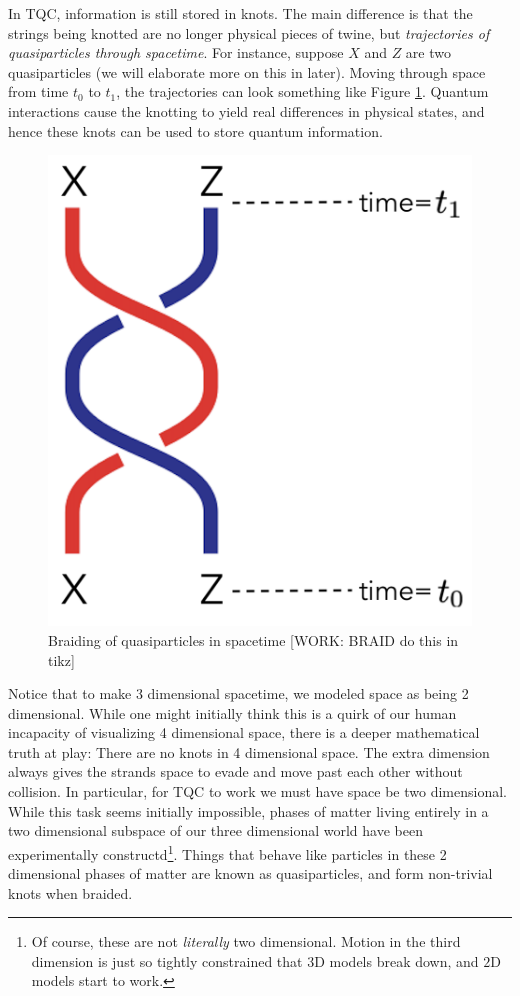 \documentclass{article}
\theoremstyle{definition}
\numberwithin{figure}{section}
\begin{document}
In TQC, information is still stored in knots. The main difference is that the strings being knotted are no longer physical pieces of twine, but \textit{trajectories of quasiparticles through spacetime}. For instance, suppose $X$ and $Z$ are two quasiparticles (we will elaborate more on this in later). Moving through space from time $t_0$ to $t_1$, the trajectories can look something like Figure \ref{fig:braiding}. Quantum interactions cause the knotting to yield real differences in physical states, and hence these knots can be used to store quantum information.

\begin{figure}
\begin{center}
\includegraphics[scale=0.25]{braiding}
\caption{Braiding of quasiparticles in spacetime [WORK: BRAID do this in tikz]}
\label{fig:braiding}
\end{center}
\end{figure}

Notice that to make 3 dimensional spacetime, we modeled space as being 2 dimensional. While one might initially think this is a quirk of our human incapacity of visualizing 4 dimensional space, there is a deeper mathematical truth at play: There are no knots in 4 dimensional space. The extra dimension always gives the strands space to evade and move past each other without collision. In particular, for TQC to work we must have space be two dimensional. While this task seems initially impossible, phases of matter living entirely in a two dimensional subspace of our three dimensional world have been experimentally constructd\footnote{Of course, these are not \textit{literally} two dimensional. Motion in the third dimension is just so tightly constrained that $3$D models break down, and $2$D models start to work.}. Things that behave like particles in these 2 dimensional phases of matter are known as quasiparticles, and form non-trivial knots when braided.
\end{document}
